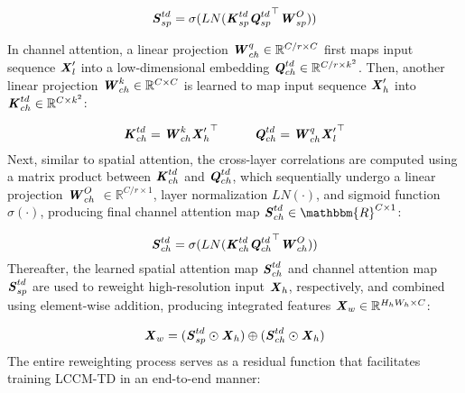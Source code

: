 \documentclass[lettersize,journal]{IEEEtran}
\begin{document}
\begin{equation}
    {\textbf{\emph{S}}}_{sp}^{td}  = \sigma(LN({\textbf{\emph{K}}}_{sp}^{td} {{\textbf{\emph{Q}}}_{sp}^{td}}^{\top}\textbf{\emph{W}}_{sp}^O))
\end{equation}


In channel attention, a linear projection $\textbf{\emph{W}}_{ch}^q\in\mathbb{R}^{C/r \times C}$ first maps input sequence $\textbf{\emph{X}}_l^{\prime}$ into a low-dimensional embedding $\textbf{\emph{Q}}_{ch}^{td}\in\mathbb{R}^{C/r \times k^2}$. Then, another linear projection $\textbf{\emph{W}}_{ch}^k\in\mathbb{R}^{C \times C}$ is learned to map input sequence $\textbf{\emph{X}}_h^{\prime}$ into $\textbf{\emph{K}}_{ch}^{td}\in \mathbb{R}^{C \times k^2}$:



\begin{equation}
    {\textbf{\emph{K}}}_{ch}^{td}= \textbf{\emph{W}}_{ch}^k{\textbf{\emph{X}}_h^{\prime}}^{\top} \hspace{1cm} {\textbf{\emph{Q}}}_{ch}^{td}  = \textbf{\emph{W}}_{ch}^q{\textbf{\emph{X}}_l^{\prime}}^{\top}
\end{equation}
Next, similar to spatial attention, the cross-layer correlations are computed using a matrix product between $\textbf{\emph{K}}_{ch}^{td}$ and $\textbf{\emph{Q}}_{ch}^{td}$, which sequentially undergo a linear projection $\textbf{\emph{W}}_{ch}^O$ $\in \mathbb{R}^{C/r \times 1}$, layer normalization $LN(\cdot)$, and sigmoid function $\sigma(\cdot)$, producing final channel attention map $\textbf{\emph{S}}_{ch}^{td}\in\mathbbm{R}^{C \times 1}$:

\begin{equation}
    {\textbf{\emph{S}}}_{ch}^{td}  = \sigma(LN({\textbf{\emph{K}}}_{ch}^{td} {{\textbf{\emph{Q}}}_{ch}^{td}}^{\top}\textbf{\emph{W}}_{ch}^O))
\end{equation}
Thereafter, the learned spatial attention map ${\textbf{\emph{S}}}_{ch}^{td}$ and channel attention map ${\textbf{\emph{S}}}_{sp}^{td}$ are used to reweight high-resolution input $\textbf{\emph{X}}_h$, respectively, and combined using element-wise addition, producing integrated features $\textbf{\emph{X}}_w\in\mathbb{R}^{H_hW_h \times C}$:

\begin{equation}\label{eq:td_weighting}
\textbf{\emph{X}}_w =({\textbf{\emph{S}}}_{sp}^{td}\odot \textbf{\emph{X}}_h) \oplus ({{\textbf{\emph{S}}}_{ch}^{td}} \odot \textbf{\emph{X}}_h)
\end{equation}
The entire reweighting process serves as a residual function that facilitates training LCCM-TD in an end-to-end manner:
\end{document}
